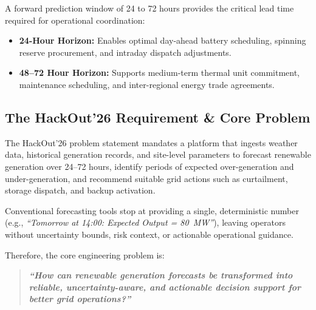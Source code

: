 A forward prediction window of 24 to 72 hours provides the critical lead time required for operational coordination:
\begin{itemize}[leftmargin=1.5em, itemsep=0.2em]
    \item \textbf{24-Hour Horizon:} Enables optimal day-ahead battery scheduling, spinning reserve procurement, and intraday dispatch adjustments.
    \item \textbf{48--72 Hour Horizon:} Supports medium-term thermal unit commitment, maintenance scheduling, and inter-regional energy trade agreements.
\end{itemize}

\subsection{The HackOut'26 Requirement \& Core Problem}
\label{subsec:hackout_requirement}

The HackOut'26 problem statement mandates a platform that ingests weather data, historical generation records, and site-level parameters to forecast renewable generation over 24--72 hours, identify periods of expected over-generation and under-generation, and recommend suitable grid actions such as curtailment, storage dispatch, and backup activation.

Conventional forecasting tools stop at providing a single, deterministic number (e.g., \emph{``Tomorrow at 14:00: Expected Output = 80~MW''}), leaving operators without uncertainty bounds, risk context, or actionable operational guidance.

Therefore, the core engineering problem is:
\begin{quote}
    \itshape\bfseries\color{primaryNavy}
    ``How can renewable generation forecasts be transformed into reliable, uncertainty-aware, and actionable decision support for better grid operations?''
\end{quote}
